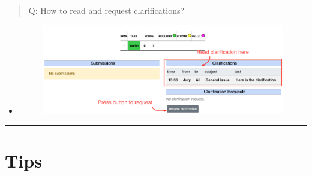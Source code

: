 \documentclass[
]{article}
\begin{document}
\begin{quote}
  Q: How to read and request clarifications?
\end{quote}

\begin{itemize}
\item
  \begin{figure}
  \centering
  \includegraphics{clarification.png}
  \end{figure}
\end{itemize}

\begin{center}\rule{0.5\linewidth}{\linethickness}\end{center}

\hypertarget{header-n119}{%
\section{Tips}\label{header-n119}}
\end{document}
